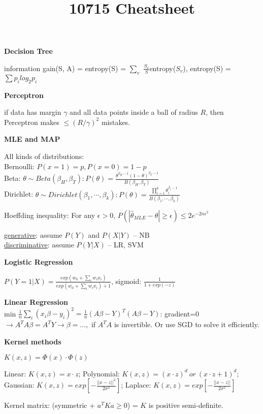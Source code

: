 \documentclass{article}
\title{10715 Cheatsheet}
\author{}
\date{}
\begin{document}
\maketitle

\noindent
\textbf{Decision Tree}

information gain(S, A) = entropy(S) = $\sum_v$ $\frac{S_v}{S}$entropy($S_v$), entropy(S) = $\sum p_i log_2 p_i$

\noindent
\textbf{Perceptron}

if data has margin $\gamma$ and all data points inside a ball of radius $R$, then Perceptron makes $\leq (R/\gamma)^2$ mistakes.

\noindent
\textbf{MLE and MAP}

All kinds of distributions: \\
Bernoulli: $P(x=1)=p, P(x=0)=1-p$ \\
Beta: $\theta \sim Beta(\beta_{H}, \beta_{T}): P(\theta) = \frac{\theta^{\beta_{H}-1} (1-\theta)^{\beta_{T}-1}}{B(\beta_{H}, \beta_{T})}$ \\
Dirichlet: $\theta \sim Dirichlet(\beta_1, \cdots, \beta_k): P(\theta) = \frac{\prod_{i=1}^k \theta_i^{\beta_i -1}}{B(\beta_1, \cdots, \beta_k)}$

\noindent
Hoeffding inequality: For any $\epsilon > 0$, $P(|\hat{\theta}_{MLE}-\theta| \geq \epsilon) \leq 2e^{-2n\epsilon^2}$

\noindent
\underline{generative}: assume $P(Y)$ and $P(X|Y)$ -- NB \\
\underline{discriminative}: assume $P(Y|X)$ -- LR, SVM

\noindent
\textbf{Logistic Regression}

$P(Y=1|X) = \frac{exp(w_0 + \sum_i w_i x_i)}{exp(w_0 + \sum_i w_i x_i) + 1}$, sigmoid: $\frac{1}{1+exp(-z)}$

\noindent
\textbf{Linear Regression} \\
min $\frac{1}{n} \sum_i (x_i \beta - y_i)^2 = \frac{1}{n} (A\beta - Y)^{T}(A\beta-Y)$: gradient=0 $\rightarrow A^{T}A\beta = A^{T}Y \rightarrow \beta = ...,$ if $A^{T}A$ is invertible. Or use SGD to solve it efficiently.

\noindent
\textbf{Kernel methods}

$K(x,z)=\Phi(x) \cdot \Phi(z)$

Linear: $K(x,z) = x \cdot z$; Polynomial: $K(x,z)=(x \cdot z)^d~ or~(x \cdot z +1)^d$; Gaussian: $K(x,z)=exp[-\frac{||x-z||^2}{2\sigma^2}]$; Laplace: $K(x,z) = exp[-\frac{||x-z||}{2\sigma^2}]$

\noindent
Kernel matrix: (symmetric + $a^{T}Ka \geq 0$) = $K$ is positive semi-definite.
\end{document}
